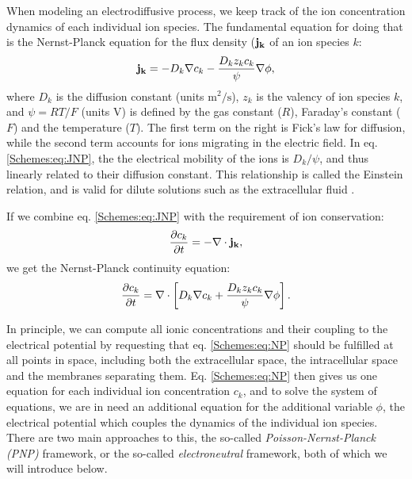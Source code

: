 When modeling an electrodiffusive process, we keep track of the ion concentration dynamics of each individual ion species. The fundamental equation for doing that is the Nernst-Planck equation for the flux density (${\bf j_k}$ of an ion species $k$:
\begin{equation}
{\bf j_k} = - D_k {\bf \nabla} c_{k} - \frac{D_k z_k c_k}{\psi} {\bf \nabla} \phi, 
\label{Schemes:eq:JNP}
\end{equation}
where ${D}_k$ is the diffusion constant (units $\mathrm{m^2/s}$), $z_{k}$ is the valency of ion species $k$, and $\psi=RT/F$ (units V) is defined by the gas constant ($R$), Faraday's constant ($F$) and the temperature ($T$). The first term on the right is Fick's law for diffusion, while the second term accounts for ions migrating in the electric field.  In eq. \ref{Schemes:eq:JNP}, the the electrical mobility of the ions is $D_k/\psi$, and thus linearly related to their diffusion constant. This relationship is called the Einstein relation, and is valid for dilute solutions such as the extracellular fluid \cite{Grodzinsky2011}.

If we combine eq. \ref{Schemes:eq:JNP} with the requirement of ion conservation:
\begin{equation}
\frac{\partial c_k}{\partial t} = -\nabla \cdot {\bf j_k},
\label{Schemes:eq:general_ionconservation}
\end{equation}
we get the Nernst-Planck continuity equation:
\begin{equation}
\frac{\partial c_k}{\partial t} = {\bf \nabla} \cdot \left[{D_k} {\bf \nabla} c_k + \frac{D_k z_k c_k}{\psi}{\bf \nabla} \phi \right].
\label{Schemes:eq:NP}
\end{equation}

In principle, we can compute all ionic concentrations and their coupling to the electrical potential by requesting that eq. \ref{Schemes:eq:NP} should be fulfilled at all points in space, including both the extracellular space, the intracellular space and the membranes separating them. Eq. \ref{Schemes:eq:NP} then gives us one equation for each individual ion concentration $c_k$, and to solve the system of equations, we are in need an additional equation for the additional variable $\phi$, the electrical potential which couples the dynamics of the individual ion species. There are two main approaches to this, the so-called \textit{Poisson-Nernst-Planck (PNP)} framework, or the so-called \textit{electroneutral} framework, both of which we will introduce below. 


